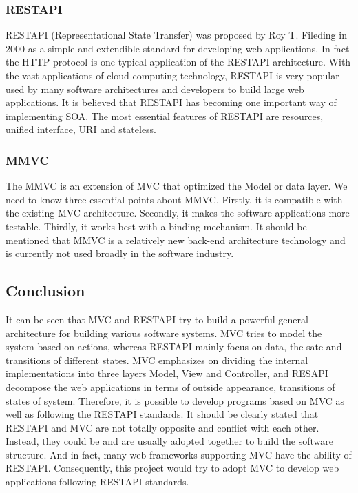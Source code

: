 \documentclass[letterpaper,10pt]{article}
\begin{document}
		\subsubsection{RESTAPI}
    RESTAPI (Representational State Transfer) was proposed by Roy T. Fileding in 2000 as a simple and extendible standard for developing web applications. In fact the HTTP protocol is one typical application of the RESTAPI architecture. With the vast applications of cloud computing technology, RESTAPI is very popular used by many software architectures and developers to build large web applications. It is believed that RESTAPI has becoming one important way of implementing SOA. The most essential features of RESTAPI are resources, unified interface, URI and stateless.

		\subsubsection{MMVC}
    The MMVC is an extension of MVC that optimized the Model or data layer. We need to know three essential points about MMVC. Firstly, it is compatible with the existing MVC architecture. Secondly, it makes the software applications more testable. Thirdly, it works best with a binding mechanism. It should be mentioned that MMVC is a relatively new back-end architecture technology and is currently not used broadly in the software industry.

	\subsection{Conclusion}
      It can be seen that MVC and RESTAPI try to build a powerful general architecture for building various software systems. MVC tries to model the system based on actions, whereas RESTAPI mainly focus on data, the sate and transitions of different states. MVC emphasizes on dividing the internal implementations into three layers Model, View and Controller, and RESAPI decompose the web applications in terms of outside appearance, transitions of states of system. Therefore, it is possible to develop programs based on MVC as well as following the RESTAPI standards.
      It should be clearly stated that RESTAPI and MVC are not totally opposite and conflict with each other. Instead, they could be and are usually adopted together to build the software structure. And in fact, many web frameworks supporting MVC have the ability of RESTAPI. Consequently, this project would try to adopt MVC to develop web applications following RESTAPI standards.
\end{document}
